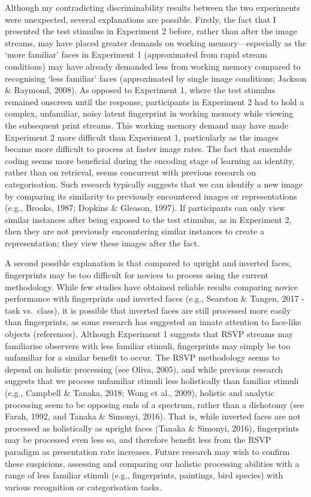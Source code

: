 \documentclass[
  english,
  man]{apa6}
\begin{document}
Although my contradicting discriminability results between the two experiments were unexpected, several explanations are possible. Firstly, the fact that I presented the test stimulus in Experiment 2 before, rather than after the image streams, may have placed greater demands on working memory---especially as the `more familiar' faces in Experiment 1 (approximated from rapid stream conditions) may have already demanded less from working memory compared to recognising `less familiar' faces (approximated by single image conditions; Jackson \& Raymond, 2008). As opposed to Experiment 1, where the test stimulus remained onscreen until the response, participants in Experiment 2 had to hold a complex, unfamiliar, noisy latent fingerprint in working memory while viewing the subsequent print streams. This working memory demand may have made Experiment 2 more difficult than Experiment 1, particularly as the images became more difficult to process at faster image rates. The fact that ensemble coding seems more beneficial during the encoding stage of learning an identity, rather than on retrieval, seems concurrent with previous research on categorisation. Such research typically suggests that we can identify a new image by comparing its similarity to previously encountered images or representations (e.g., Brooks, 1987; Dopkins \& Gleason, 1997). If participants can only view similar instances after being exposed to the test stimulus, as in Experiment 2, then they are not previously encountering similar instances to create a representation; they view these images after the fact.

A second possible explanation is that compared to upright and inverted faces, fingerprints may be too difficult for novices to process using the current methodology. While few studies have obtained reliable results comparing novice performance with fingerprints and inverted faces (e.g., Searston \& Tangen, 2017 - task vs.~class), it is possible that inverted faces are still processed more easily than fingerprints, as some research has suggested an innate attention to face-like objects (references). Although Experiment 1 suggests that RSVP streams may familiarise observers with less familiar stimuli, fingerprints may simply be too unfamiliar for a similar benefit to occur. The RSVP methodology seems to depend on holistic processing (see Oliva, 2005), and while previous research suggests that we process unfamiliar stimuli less holistically than familiar stimuli (e.g., Campbell \& Tanaka, 2018; Wong et al., 2009), holistic and analytic processing seem to be opposing ends of a spectrum, rather than a dichotomy (see Farah, 1992, and Tanaka \& Simonyi, 2016). That is, while inverted faces are not processed as holistically as upright faces (Tanaka \& Simonyi, 2016), fingerprints may be processed even less so, and therefore benefit less from the RSVP paradigm as presentation rate increases. Future research may wish to confirm these suspicions, assessing and comparing our holistic processing abilities with a range of less familiar stimuli (e.g., fingerprints, paintings, bird species) with various recognition or categorisation tasks.
\end{document}
